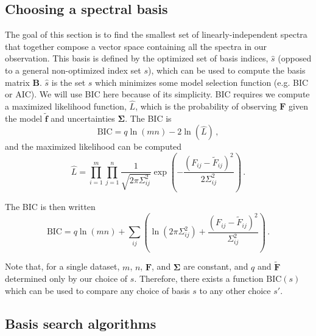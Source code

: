 \documentclass[twocolumn,linenumbers]{aastex7}
\begin{document}
\subsection{Choosing a spectral basis}
\label{ap:choose-basis}
The goal of this section is to find the smallest set of linearly-independent spectra that together compose a vector space containing all the spectra in our observation. This basis is defined by the optimized set of basis indices, $\hat{s}$ (opposed to a general non-optimized index set $s$), which can be used to compute the basis matrix $\mathbf{B}$. $\hat{s}$ is the set $s$ which minimizes some model selection function (e.g. BIC or AIC). We will use BIC here because of its simplicity. BIC requires we compute a maximized likelihood function, $\hat{L}$, which is the probability of observing $\mathbf{F}$ given the model $\tilde{\mathbf{f}}$ and uncertainties $\mathbf{\Sigma}$. The BIC is
\begin{equation}
    \text{BIC} = q\ln{(mn)} - 2\ln{(\hat{L})}\, ,
\end{equation}
and the maximized likelihood can be computed
\begin{equation}
    \hat{L} = \prod_{i=1}^m \prod_{j=1}^n \frac{1}{\sqrt{2\pi \Sigma_{ij}^2}} \exp{\left (-\frac{(F_{ij} - \tilde{F}_{ij})^2}{2\Sigma_{ij}^2}\right )}\, .
\end{equation}

The BIC is then written
\begin{equation}
    \label{eq:bic2}
    \text{BIC} = q\ln{(mn)} + \sum_{ij} \left (\ln{(2\pi\Sigma_{ij}^2)} + \frac{(F_{ij} - \tilde{F}_{ij})^2}{\Sigma_{ij}^2}\right )\, .
\end{equation}

Note that, for a single dataset, $m$, $n$, $\mathbf{F}$, and $\mathbf{\Sigma}$ are constant, and $q$ and $\tilde{\mathbf{F}}$ determined only by our choice of $s$. Therefore, there exists a function $\text{BIC}(s)$ which can be used to compare any choice of basis $s$ to any other choice $s'$.

\subsection{Basis search algorithms}
\end{document}
